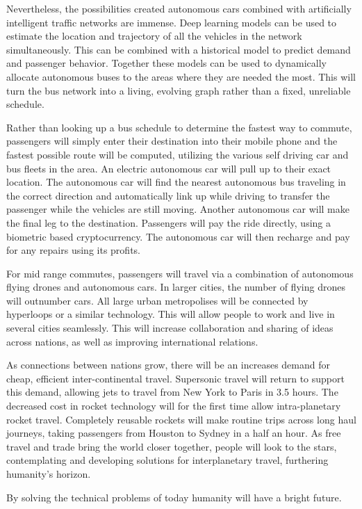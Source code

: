 Nevertheless, the possibilities created autonomous cars combined with artificially intelligent traffic networks are immense.
Deep learning models can be used to estimate the location and trajectory of all the vehicles in the network simultaneously.
This can be combined with a historical model to predict demand and passenger behavior.
Together these models can be used to dynamically allocate autonomous buses to the areas where they are needed the most.
This will turn the bus network into a living, evolving graph rather than a fixed, unreliable schedule.

Rather than looking up a bus schedule to determine the fastest way to commute, passengers will simply enter their destination into their mobile phone and the fastest possible route will be computed, utilizing the various self driving car and bus fleets in the area.
An electric autonomous car will pull up to their exact location.
The autonomous car will find the nearest autonomous bus traveling in the correct direction and automatically link up while driving to transfer the passenger while the vehicles are still moving.
Another autonomous car will make the final leg to the destination.
Passengers will pay the ride directly, using a biometric based cryptocurrency.
The autonomous car will then recharge and pay for any repairs using its profits.

For mid range commutes, passengers will travel via a combination of autonomous flying drones and autonomous cars.
In larger cities, the number of flying drones will outnumber cars.
All large urban metropolises will be connected by hyperloops or a similar technology.
This will allow people to work and live in several cities seamlessly.
This will increase collaboration and sharing of ideas across nations, as well as improving international relations.

As connections between nations grow, there will be an increases demand for cheap, efficient inter-continental travel.
Supersonic travel will return to support this demand, allowing jets to travel from New York to Paris in 3.5 hours.
The decreased cost in rocket technology will for the first time allow intra-planetary rocket travel.
Completely reusable rockets will make routine trips across long haul journeys, taking passengers from Houston to Sydney in a half an hour.
As free travel and trade bring the world closer together, people will look to the stars, contemplating and developing solutions for interplanetary travel, furthering humanity's horizon.

By solving the technical problems of today humanity will have a bright future.

